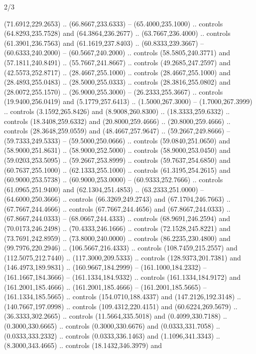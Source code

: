 \begin{flagdescription}{2/3}
\begin{scope}[xshift=0.5\flaglength,yshift=0.5\flagwidth,scale=\flagwidth/525.28]
\begin{scope}[y=0.1mm, x=0.1mm, yscale=-1,shift={(-381.5,-404)}]
\begin{scope}[shift={(5.25001,4.53053)},miter limit=4.00,line width=0.800\lw]
  (71.6912,229.2653) .. (66.8667,233.6333) -- (65.4000,235.1000) .. controls
  (64.8293,235.7528) and (64.3864,236.2677) .. (63.7667,236.4000) .. controls
  (61.3901,236.7563) and (61.1619,237.8403) .. (60.8333,239.3667) --
  (60.6333,240.2000) -- (60.5667,240.2000) .. controls (58.5805,240.3771) and
  (57.1811,240.8491) .. (55.7667,241.8667) .. controls (49.2685,247.2597) and
  (42.5573,252.8717) .. (28.4667,255.1000) .. controls (28.4667,255.1000) and
  (28.4893,255.0483) .. (28.5000,255.0333) .. controls (28.3816,255.0802) and
  (28.0072,255.1570) .. (26.9000,255.3000) -- (26.2333,255.3667) .. controls
  (19.9400,256.0419) and (5.1779,257.6413) .. (1.5000,267.3000) --
  (1.7000,267.3999) .. controls (3.1592,265.8426) and (8.9008,260.8300) ..
  (18.3333,259.6332) .. controls (18.3408,259.6332) and (20.8000,259.4666) ..
  (20.8000,259.4666) .. controls (28.3648,259.0559) and (48.4667,257.9647) ..
  (59.2667,249.8666) -- (59.7333,249.5333) -- (59.5000,250.0666) .. controls
  (59.0840,251.0650) and (58.9000,251.8631) .. (58.9000,252.5000) .. controls
  (58.9000,253.0450) and (59.0203,253.5095) .. (59.2667,253.8999) .. controls
  (59.7637,254.6850) and (60.7637,255.1000) .. (62.1333,255.1000) .. controls
  (61.3195,254.2615) and (60.9000,253.5738) .. (60.9000,253.0000) --
  (60.9333,252.7666) .. controls (61.0965,251.9400) and (62.1304,251.4853) ..
  (63.2333,251.0000) -- (64.6000,250.3666) .. controls (66.3269,249.2743) and
  (67.1704,246.7663) .. (67.7667,244.4666) .. controls (67.7667,244.4656) and
  (67.8667,244.0333) .. (67.8667,244.0333) -- (68.0667,244.4333) .. controls
  (68.9691,246.2594) and (70.0173,246.2498) .. (70.4333,246.1666) .. controls
  (72.1528,245.8221) and (73.7691,242.8959) .. (73.8000,240.0000) .. controls
  (86.2235,230.4800) and (99.7976,220.2946) .. (106.5667,216.4333) .. controls
  (108.7459,215.2557) and (112.5075,212.7440) .. (117.3000,209.5333) .. controls
  (128.9373,201.7381) and (146.4973,189.9831) .. (160.9667,184.2999) --
  (161.1000,184.2332) -- (161.1667,184.3666) -- (161.1334,184.9332) .. controls
  (161.1334,184.9172) and (161.2001,185.4666) .. (161.2001,185.4666) --
  (161.2001,185.5665) -- (161.1334,185.5665) .. controls (154.0710,188.4337) and
  (147.2126,192.3148) .. (140.7667,197.0998) .. controls (109.4312,220.4151) and
  (60.6224,269.5679) .. (36.3333,302.2665) .. controls (11.5664,335.5018) and
  (0.4099,330.7188) .. (0.3000,330.6665) .. controls (0.3000,330.6676) and
  (0.0333,331.7058) .. (0.0333,333.2332) .. controls (0.0333,336.1463) and
  (1.1096,341.3343) .. (8.3000,343.4665) .. controls (18.1432,346.3979) and

\end{scope}
\end{scope}
\end{scope}
\end{flagdescription}
